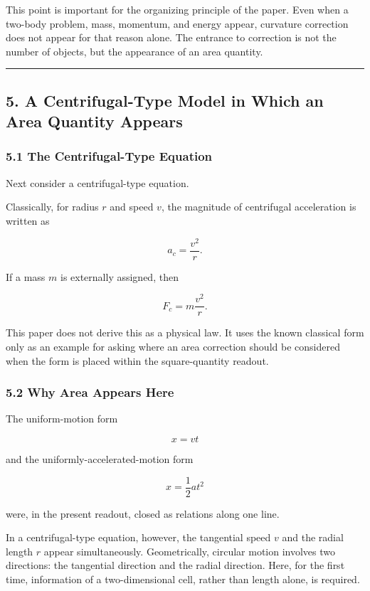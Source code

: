 \documentclass[
]{ltjsarticle}
\begin{document}
This point is important for the organizing principle of the paper. Even
when a two-body problem, mass, momentum, and energy appear, curvature
correction does not appear for that reason alone. The entrance to
correction is not the number of objects, but the appearance of an area
quantity.

\begin{center}\rule{0.5\linewidth}{0.5pt}\end{center}

\subsection{5. A Centrifugal-Type Model in Which an Area Quantity
Appears}\label{a-centrifugal-type-model-in-which-an-area-quantity-appears}

\subsubsection{5.1 The Centrifugal-Type
Equation}\label{the-centrifugal-type-equation}

Next consider a centrifugal-type equation.

Classically, for radius \(r\) and speed \(v\), the magnitude of
centrifugal acceleration is written as

\[
a_c=\frac{v^2}{r}.
\]

If a mass \(m\) is externally assigned, then

\[
F_c=m\frac{v^2}{r}.
\]

This paper does not derive this as a physical law. It uses the known
classical form only as an example for asking where an area correction
should be considered when the form is placed within the square-quantity
readout.

\subsubsection{5.2 Why Area Appears Here}\label{why-area-appears-here}

The uniform-motion form

\[
x=vt
\]

and the uniformly-accelerated-motion form

\[
x=\frac{1}{2}at^2
\]

were, in the present readout, closed as relations along one line.

In a centrifugal-type equation, however, the tangential speed \(v\) and
the radial length \(r\) appear simultaneously. Geometrically, circular
motion involves two directions: the tangential direction and the radial
direction. Here, for the first time, information of a two-dimensional
cell, rather than length alone, is required.
\end{document}
